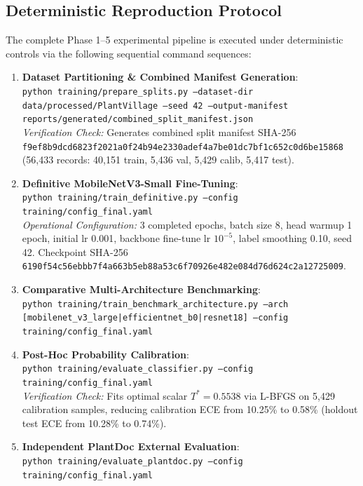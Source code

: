 \documentclass[pdflatex,sn-mathphys-num]{sn-jnl}
\theoremstyle{thmstyleone}%
\theoremstyle{thmstyletwo}%
\theoremstyle{thmstylethree}%
\begin{document}
\subsection*{Deterministic Reproduction Protocol}
The complete Phase 1--5 experimental pipeline is executed under deterministic controls via the following sequential command sequences:
\begin{enumerate}
  \item \textbf{Dataset Partitioning \& Combined Manifest Generation}:\\
        \texttt{python training/prepare\_splits.py --dataset-dir data/processed/PlantVillage --seed 42 --output-manifest reports/generated/combined\_split\_manifest.json}\\
        \textit{Verification Check:} Generates combined split manifest SHA-256 \texttt{f9ef8b9dcd6823f2021a0f24b94e2330adef4a7be01dc7bf1c652c0d6be15868} (56{,}433 records: 40{,}151 train, 5{,}436 val, 5{,}429 calib, 5{,}417 test).
  \item \textbf{Definitive MobileNetV3-Small Fine-Tuning}:\\
        \texttt{python training/train\_definitive.py --config training/config\_final.yaml}\\
        \textit{Operational Configuration:} 3 completed epochs, batch size 8, head warmup 1 epoch, initial lr 0.001, backbone fine-tune lr $10^{-5}$, label smoothing 0.10, seed 42. Checkpoint SHA-256 \texttt{6190f54c56ebbb7f4a663b5eb88a53c6f70926e482e084d76d624c2a12725009}.
  \item \textbf{Comparative Multi-Architecture Benchmarking}:\\
        \texttt{python training/train\_benchmark\_architecture.py --arch [mobilenet\_v3\_large|efficientnet\_b0|resnet18] --config training/config\_final.yaml}
  \item \textbf{Post-Hoc Probability Calibration}:\\
        \texttt{python training/evaluate\_classifier.py --config training/config\_final.yaml}\\
        \textit{Verification Check:} Fits optimal scalar $T^* = 0.5538$ via L-BFGS on 5{,}429 calibration samples, reducing calibration ECE from 10.25\% to 0.58\% (holdout test ECE from 10.28\% to 0.74\%).
  \item \textbf{Independent PlantDoc External Evaluation}:\\
        \texttt{python training/evaluate\_plantdoc.py --config training/config\_final.yaml}\\

\end{enumerate}
\end{document}
